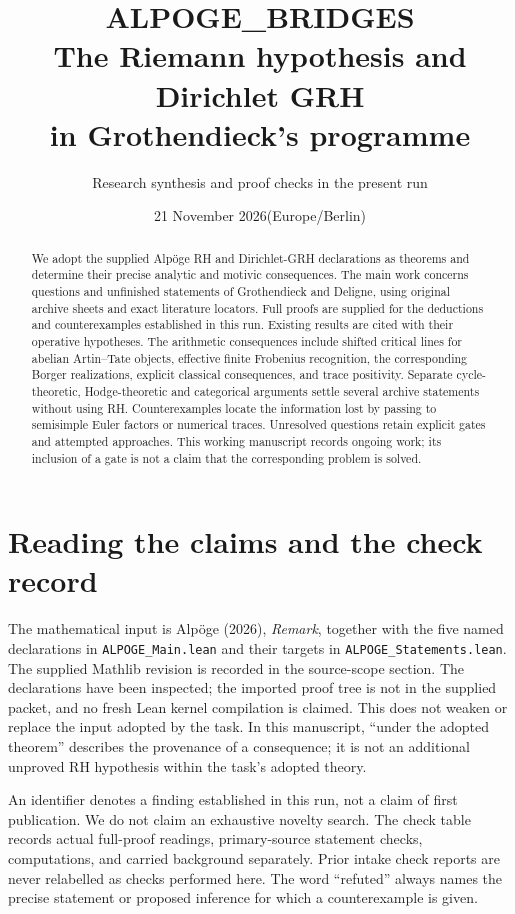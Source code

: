 \documentclass[11pt,a4paper]{article}
\title{ALPOGE\_BRIDGES\\The Riemann hypothesis and Dirichlet GRH\\in Grothendieck's programme}
\author{Research synthesis and proof checks in the present run}
\date{21 November 2026\quad\textnormal{(Europe/Berlin)}}
\theoremstyle{definition}\newtheorem{definition}[theorem]{Definition}
\theoremstyle{remark}\newtheorem{remark}[theorem]{Remark}
\begin{document}
\maketitle
\begin{abstract}
We adopt the supplied Alp\"oge RH and Dirichlet-GRH declarations as
theorems and determine their precise analytic and motivic consequences.
The main work concerns questions and unfinished statements of Grothendieck
and Deligne, using original archive sheets and exact literature locators.
Full proofs are supplied for the deductions and counterexamples established
in this run. Existing results are cited with their operative hypotheses.
The arithmetic consequences include shifted critical lines for abelian
Artin--Tate objects, effective finite Frobenius recognition, the corresponding
Borger realizations, explicit classical consequences, and trace positivity.
Separate cycle-theoretic, Hodge-theoretic and categorical arguments settle
several archive statements without using RH. Counterexamples locate the
information lost by passing to semisimple Euler factors or numerical traces.
Unresolved questions retain explicit gates and attempted approaches.
This working manuscript records ongoing work; its inclusion of a gate
is not a claim that the corresponding problem is solved.
\end{abstract}

\section*{Reading the claims and the check record}
The mathematical input is Alp\"oge (2026), \emph{Remark}, together with
the five named declarations in \nolinkurl{ALPOGE_Main.lean} and their
targets in \nolinkurl{ALPOGE_Statements.lean}. The supplied Mathlib revision
is recorded in the source-scope section. The declarations have been
inspected; the imported proof tree is not in the supplied packet, and
no fresh Lean kernel compilation is claimed. This does not weaken or
replace the input adopted by the task. In this manuscript, ``under the
adopted theorem'' describes the provenance of a consequence; it is not
an additional unproved RH hypothesis within the task's adopted theory.

An identifier denotes a finding established in this run, not a claim
of first publication. We do not claim an exhaustive novelty search.
The check table records actual full-proof readings, primary-source
statement checks, computations, and carried background separately.
Prior intake check reports are never relabelled as checks performed
here. The word ``refuted'' always names the precise statement or
proposed inference for which a counterexample is given.
\end{document}
